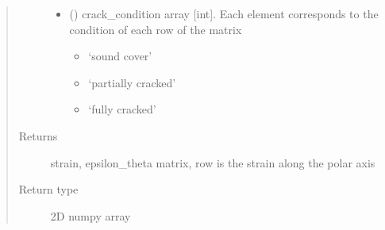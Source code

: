 \documentclass[letterpaper,10pt,english]{sphinxmanual}
\begin{document}
\begin{fulllineitems}
\begin{quote}
\begin{description}
\begin{itemize}
\item {} 
\sphinxAtStartPar
{} () \textendash{} 
\sphinxAtStartPar
crack\_condition array {[}int{]}. Each element corresponds to the condition of each row of the matrix
\begin{itemize}
\item {} 
 ‘sound cover’

\item {} 
 ‘partially cracked’

\item {} 
 ‘fully cracked’

\end{itemize}


\end{itemize}

\item[{Returns}] \leavevmode
\sphinxAtStartPar
strain, epsilon\_theta matrix, row is the strain along the polar axis

\item[{Return type}] \leavevmode
\sphinxAtStartPar
2D numpy array

\end{description}\end{quote}

\end{fulllineitems}

\end{document}
